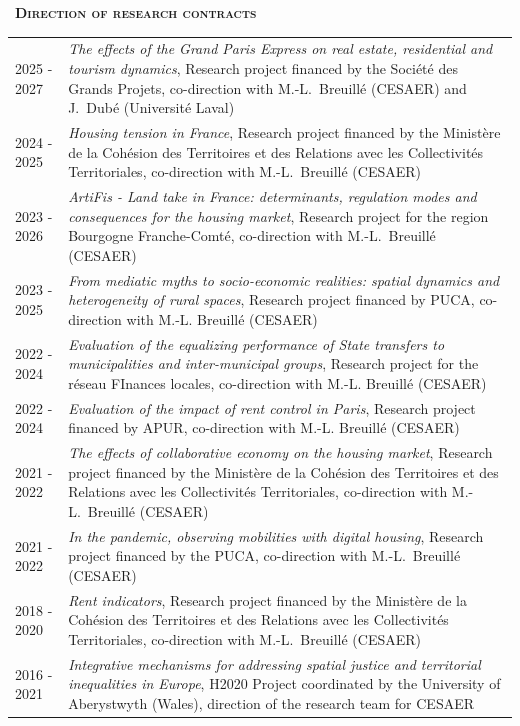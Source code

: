 \documentclass[a4paper,12pt]{article}
\newcommand{\smalltitre}[1]{%
	\noindent \textbullet~\textsc{\textbf{#1}}
	\smallskip
	}
\begin{document}
\smalltitre{Direction of research contracts} 

\noindent \begin{longtable}{@{}p{\annee}p{\texte}@{}}

2025 - 2027 & \og{}\textit{The effects of the Grand Paris Express on real estate, residential and tourism dynamics}\fg{}, Research project financed by the Société des Grands Projets, co-direction with M.-L.~Breuillé (CESAER) and J.~Dubé (Université Laval) \\
2024 - 2025 & \og{}\textit{Housing tension in France}\fg{}, Research project financed by the Ministère de la Cohésion des Territoires et des Relations avec les Collectivités Territoriales, co-direction with M.-L.~Breuillé (CESAER) \\
2023 - 2026 & \og{}\textit{ArtiFis - Land take in France: determinants, regulation modes and consequences for the housing market}\fg{}, Research project for the region Bourgogne Franche-Comté, co-direction with M.-L.~Breuillé (CESAER) \\
2023 - 2025 & \og{}\textit{From mediatic myths to socio-economic realities: spatial dynamics and heterogeneity of rural spaces}\fg{}, Research project financed by PUCA, co-direction with M.-L. Breuillé (CESAER) \\
2022 - 2024 & \og{}\textit{Evaluation of the equalizing performance of State transfers to municipalities and inter-municipal groups}\fg{}, Research project for the réseau FInances locales, co-direction with M.-L. Breuillé (CESAER) \\
2022 - 2024 & \og{}\textit{Evaluation of the impact of rent control in Paris}\fg{}, Research project financed by APUR, co-direction with M.-L. Breuillé (CESAER) \\
2021 - 2022 & \og{}\textit{The effects of collaborative economy on the housing market}\fg{}, Research project financed by the Ministère de la Cohésion des Territoires et des Relations avec les Collectivités Territoriales, co-direction with M.-L.~Breuillé (CESAER) \\
2021 - 2022 & \og{}\textit{In the pandemic, observing mobilities with digital housing}\fg{}, Research project financed by the PUCA, co-direction with M.-L.~Breuillé (CESAER) \\
2018 - 2020 & \og{}\textit{Rent indicators}\fg{}, Research project financed by the Ministère de la Cohésion des Territoires et des Relations avec les Collectivités Territoriales, co-direction with M.-L.~Breuillé (CESAER) \\
2016 - 2021 & \og{}\textit{Integrative mechanisms for addressing spatial justice and territorial inequalities in Europe}\fg{}, H2020 Project coordinated by the University of Aberystwyth (Wales), direction of the research team for CESAER \\

\end{longtable}
\end{document}
